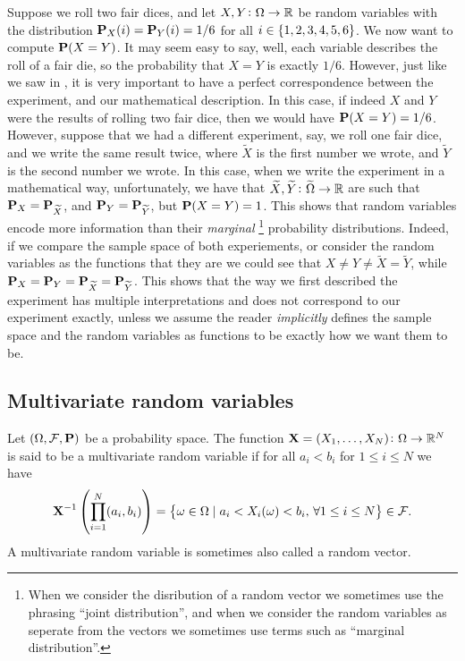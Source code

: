 \documentclass[11pt,a4paper]{article}
\begin{document}
\begin{example}
  \label{exmp:random-vectors}
  Suppose we roll two fair dices,
  and let $X,Y \colon \Omega \to \mathbb{R}$ be random variables
  with the distribution $\mathbf{P}_X(i) = \mathbf{P}_Y(i) = 1/6$
  for all $i \in \left\{1,2,3,4,5,6\right\}$.
  We now want to compute $\mathbf{P}(X = Y)$.
  It may seem easy to say, well, each variable describes the roll
  of a fair die, so the probability that $X = Y$ is exactly $1/6$.
  However, just like we saw in ,
  it is very important to have a perfect correspondence between
  the experiment, and our mathematical description.
  In this case, if indeed $X$ and $Y$ were the results of rolling two
  fair dice, then we would have $\mathbf{P}(X = Y) = 1/6$.
  However, suppose that we had a different experiment,
  say, we roll one fair dice, and we write the same result
  twice, where $\widetilde X$ is the first number we wrote,
  and $\widetilde Y$ is the second number we wrote.
  In this case, when we write the experiment in
  a mathematical way, unfortunately,
  we have that $\widetilde X, \widetilde Y \colon \widetilde \Omega \to \mathbb{R}$
  are such that $\mathbf{P}_X = \mathbf{P}_{\widetilde X}$,
  and $\mathbf{P}_Y = \mathbf{P}_{\widetilde Y}$,
  but $\mathbf{P}(X = Y) = 1$.
  This shows that random variables encode more information than their
  \textit{marginal}
  \footnote{When we consider the disribution of a random vector
  we sometimes use the phrasing ``joint distribution'',
  and when we consider the random variables as seperate from the vectors
  we sometimes use terms such as ``marginal distribution''.}
  probability distributions.
  Indeed, if we compare the sample space of both experiements,
  or consider the random variables as the functions that they are
  we could see that $X \neq Y \neq \widetilde X = \widetilde Y$,
  while $\mathbf{P}_X = \mathbf{P}_Y = \mathbf{P}_{\widetilde X} = \mathbf{P}_{\widetilde Y}$.
  This shows that the way we first described the experiment has multiple
  interpretations and does not correspond to our experiment exactly,
  unless we assume the reader \textit{implicitly} defines the sample space
  and the random variables as functions to be exactly how we want them to be.
\end{example}

\subsection{Multivariate random variables}
\begin{definition}
  Let $(\Omega, \mathcal F, \mathbf{P})$ be a probability space.
  The function $\boldsymbol{\mathbf{X}} = (X_1,\dots,X_N) \colon \Omega \to \mathbb{R}^N$ is said
  to be a multivariate random variable if for all $a_i < b_i$ for 
  $1 \le i \le N$ we have
  \[
    \boldsymbol{\mathbf{X}}^{-1}\left(\prod_{i=1}^{N} (a_i, b_i)\right) =
    \left\{\omega \in \Omega \mid
    a_i < X_i(\omega) < b_i,\, \forall 1 \le i \le N\right\} \in
    \mathcal F.
  \]
  A multivariate random variable is sometimes also called a random vector.
\end{definition}
\end{document}
